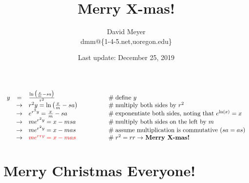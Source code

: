 \documentclass[11pt, oneside]{article}   	%
\title{Merry X-mas!}
\author{David Meyer \\ dmm@\{1-4-5.net,uoregon.edu\}}
\date{Last update: December 25, 2019}							%
\theoremstyle{definition}
\begin{document}
\maketitle


\begin{equation*}
\begin{array}{rcll} 
y
&=& \frac{\ln \big (\frac{x}{m} -  sa  \big ) }{r^2}                                      &\qquad \qquad \mathrel{\#} \text{define $y$}                                                                   \\
&\rightarrow& r^2 y                          = \ln \big (\frac{x}{m} -  sa  \big )    &\qquad \qquad  \mathrel{\#} \text{multiply both sides by $r^2$}                                       \\
&\rightarrow& e^{r^2y}                     = \frac{x}{m} -  sa                           &\qquad \qquad \mathrel{\#} \text{exponentiate both sides, noting that $e^{\ln(x)} = x$}  \\
&\rightarrow& m e^{r^2y}                 = x - msa                                        &\qquad \qquad \mathrel{\#} \text{multiply both sides on the left by $m$}                         \\
&\rightarrow& m e^{r^2y}                 = x - mas                                        &\qquad \qquad \mathrel{\#} \text{assume multiplication is commutative ($sa = as$)}       \\
&\rightarrow& \color{red}{m e^{rry}  = x - mas}                                       &\qquad \qquad \mathrel{\#} \text{$r^2 = rr \rightarrow$ \bf{Merry X-mas!}}
\end{array}
\end{equation*}

\section*{Merry Christmas Everyone!}
\end{document}
